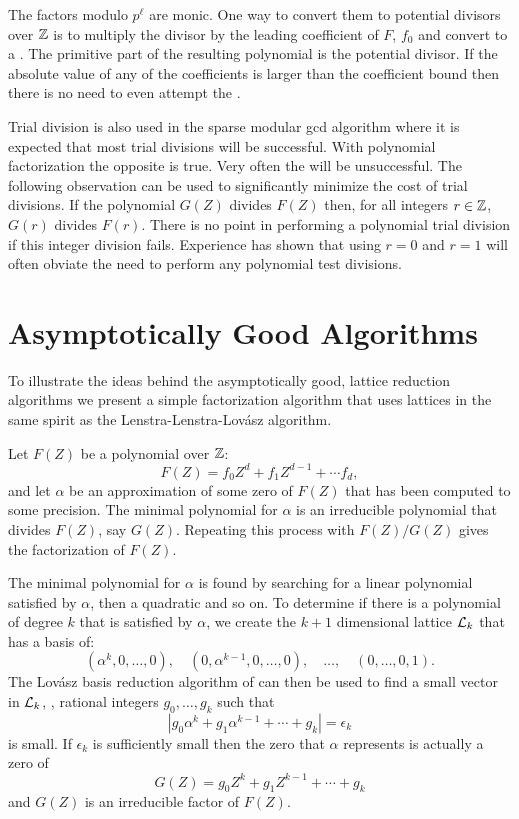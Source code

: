 The factors modulo $p^{\ell}$ are monic.  One way to convert them to
potential divisors over $\mathbb{Z}$ is to multiply the divisor by the leading
coefficient of $F$, $f_0$ and convert to a .  The primitive part of the resulting polynomial is the potential divisor.  If
the absolute value of any of the coefficients is larger than the
coefficient bound then there is no need to even attempt the
.

Trial division is also used in the sparse modular {\sc gcd}
algorithm where it is expected that most trial divisions will be
successful.  With polynomial factorization the opposite is true.
Very often the  will be unsuccessful.  The following
observation can be used to significantly minimize the cost of trial
divisions.  If the polynomial $G(Z)$ divides $F(Z)$ then,
for all integers $r \in \mathbb{Z}$, $G(r)$ divides $F(r)$.  There is no point
in performing a polynomial trial division if this integer division fails.
Experience has shown \cite{abbot:1985:rf} that using $r= 0$ and $r=1$ will
often obviate the need to perform any polynomial test divisions.

\section{Asymptotically Good Algorithms}
\label{UF:LLL:Sec}

To illustrate the ideas behind the asymptotically good, lattice
reduction algorithms we present a simple factorization algorithm that
uses lattices in the same spirit as the Lenstra-Lenstra-Lov\'asz
algorithm.

Let $F(Z)$ be a polynomial over $\mathbb{Z}$:
\[
F(Z) = f_0 Z^d + f_1 Z^{d-1} + \cdots f_d,
\]
and let $\alpha$ be an approximation of some zero of $F(Z)$ that has
been computed to some precision.  The minimal polynomial for $\alpha$
is an irreducible polynomial that divides $F(Z)$, say $G(Z)$.
Repeating this process with $F(Z)/G(Z)$ gives the factorization of
$F(Z)$.

The minimal polynomial for $\alpha$ is found by searching for a
linear polynomial satisfied by $\alpha$, then a quadratic and so on.
To determine if there is a polynomial of degree $k$ that is satisfied
by $\alpha$, we create the $k+1$ dimensional lattice ${\cal L}_k$ that
has a basis of:
\[
(\alpha^k, 0, \ldots, 0), \quad(0, \alpha^{k-1}, 0, \ldots, 0), 
\quad\ldots, \quad(0, \ldots, 0, 1).
\]
The Lov\'asz basis reduction algorithm of 
can then be used to find a small vector in ${\cal L}_k$, \ie, rational
integers $g_0, \ldots, g_k$ such that 
\[
\left|g_0 \alpha^k + g_1 \alpha^{k-1} + \cdots + g_k\right| =
\epsilon_k
\]
is small.  If $\epsilon_k$ is sufficiently small then the zero that
$\alpha$ represents is actually a zero of
\[
G(Z) = g_0 Z^k + g_1 Z^{k-1} + \cdots + g_k
\]
and $G(Z)$ is an irreducible factor of $F(Z)$.


